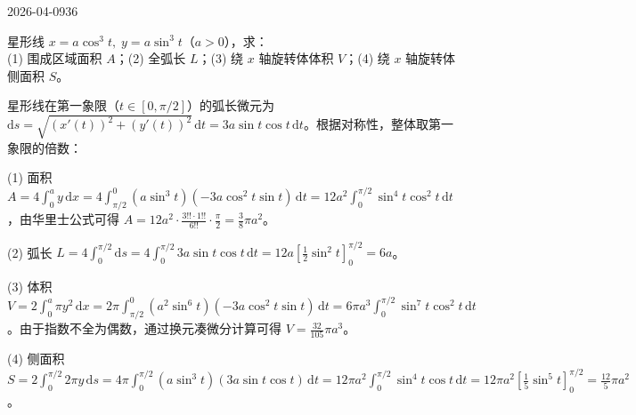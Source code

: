 \begin{mistake}{2026-04-09}{36}

\begin{problemcontent}
星形线 \( x = a\cos^3 t,\; y = a\sin^3 t \)（\( a > 0 \)），求：\\
(1) 围成区域面积 \( A \)；(2) 全弧长 \( L \)；(3) 绕 \( x \) 轴旋转体体积 \( V \)；(4) 绕 \( x \) 轴旋转体侧面积 \( S \)。
\end{problemcontent}

\begin{solutioncontent}
星形线在第一象限（\( t \in [0, \pi/2] \)）的弧长微元为 \( \mathrm{d}s = \sqrt{(x'(t))^2 + (y'(t))^2}\,\mathrm{d}t = 3a\sin t\cos t\,\mathrm{d}t \)。根据对称性，整体取第一象限的倍数：

(1) 面积 \( A = 4 \int_{0}^{a} y\,\mathrm{d}x = 4 \int_{\pi/2}^{0} (a\sin^3 t)(-3a\cos^2 t\sin t)\,\mathrm{d}t = 12a^2 \int_{0}^{\pi/2} \sin^4 t \cos^2 t\,\mathrm{d}t \)，由华里士公式可得 \( A = 12a^2 \cdot \frac{3!! \cdot 1!!}{6!!} \cdot \frac{\pi}{2} = \frac{3}{8}\pi a^2 \)。

(2) 弧长 \( L = 4 \int_{0}^{\pi/2} \mathrm{d}s = 4 \int_{0}^{\pi/2} 3a\sin t\cos t\,\mathrm{d}t = 12a \left[ \frac{1}{2}\sin^2 t \right]_0^{\pi/2} = 6a \)。

(3) 体积 \( V = 2 \int_{0}^{a} \pi y^2\,\mathrm{d}x = 2\pi \int_{\pi/2}^{0} (a^2\sin^6 t)(-3a\cos^2 t\sin t)\,\mathrm{d}t = 6\pi a^3 \int_{0}^{\pi/2} \sin^7 t \cos^2 t\,\mathrm{d}t \)。由于指数不全为偶数，通过换元凑微分计算可得 \( V = \frac{32}{105}\pi a^3 \)。

(4) 侧面积 \( S = 2 \int_{0}^{\pi/2} 2\pi y\,\mathrm{d}s = 4\pi \int_{0}^{\pi/2} (a\sin^3 t)(3a\sin t\cos t)\,\mathrm{d}t = 12\pi a^2 \int_{0}^{\pi/2} \sin^4 t \cos t\,\mathrm{d}t = 12\pi a^2 \left[ \frac{1}{5}\sin^5 t \right]_0^{\pi/2} = \frac{12}{5}\pi a^2 \)。
\end{solutioncontent}


\end{mistake}
